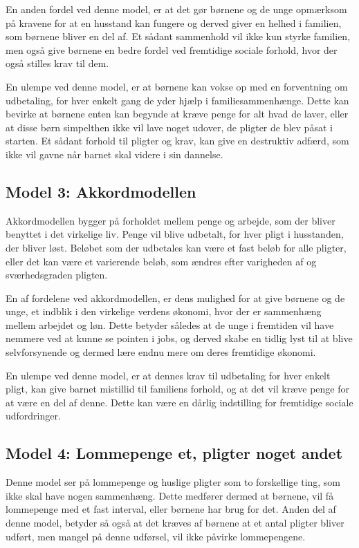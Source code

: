 En anden fordel ved denne model, er at det gør 
børnene og de unge opmærksom på kravene for at 
en husstand kan fungere og derved giver en 
helhed i familien, som børnene bliver en del af. 
Et sådant sammenhold vil ikke kun styrke 
familien, men også give børnene en bedre fordel 
ved fremtidige sociale forhold, hvor der også 
stilles krav til dem.

En ulempe ved denne model, er at børnene kan 
vokse op med en forventning om udbetaling, for 
hver enkelt gang de yder hjælp i 
familiesammenhænge. Dette kan bevirke at børnene 
enten kan begynde at kræve penge for alt hvad de 
laver, eller at disse børn simpelthen ikke vil 
lave noget udover, de pligter de blev påsat i 
starten. Et sådant forhold til pligter og krav, 
kan give en destruktiv adfærd, som ikke vil 
gavne når barnet skal videre i sin dannelse.

\subsection{Model 3: Akkordmodellen}
Akkordmodellen bygger på forholdet mellem penge 
og arbejde, som der bliver benyttet i det 
virkelige liv. Penge vil blive udbetalt, for 
hver pligt i husstanden, der bliver løst. 
Beløbet som der udbetales kan være et fast beløb 
for alle pligter, eller det kan være et 
varierende beløb, som ændres efter varigheden af 
og sværhedsgraden pligten.

En af fordelene ved akkordmodellen, er dens 
mulighed for at give børnene og de unge, et 
indblik i den virkelige verdens økonomi, hvor 
der er sammenhæng mellem arbejdet og løn. Dette 
betyder således at de unge i fremtiden vil have 
nemmere ved at kunne se pointen i jobs, og 
derved skabe en tidlig lyst til at blive 
selvforsynende og dermed lære endnu mere om 
deres fremtidige økonomi.

En ulempe ved denne model, er at dennes krav til 
udbetaling for hver enkelt pligt, kan give 
barnet mistillid til familiens forhold, og at 
det vil kræve penge for at være en del af denne. 
Dette kan være en dårlig indstilling for 
fremtidige sociale udfordringer.

\subsection{Model 4: Lommepenge et, pligter 
noget andet}
Denne model ser på lommepenge og huslige pligter 
som to forskellige ting, som ikke skal have 
nogen sammenhæng. Dette medfører dermed at 
børnene, vil få lommepenge med et fast interval, 
eller børnene har brug for det. Anden del af 
denne model, betyder så også at det kræves af 
børnene at et antal pligter bliver udført, men 
mangel på denne udførsel, vil ikke påvirke 
lommepengene.

